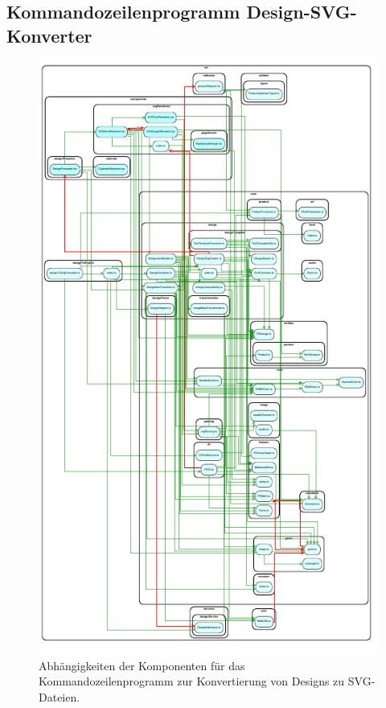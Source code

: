 \subsection{Kommandozeilenprogramm Design-SVG-Konverter}
\begin{figure}[H]
    \centering
    \includegraphics{diagrams/Ist-Architektur/designToSvgCLI-analysis.pdf}
    \caption{Abhängigkeiten der Komponenten für das Kommandozeilenprogramm zur Konvertierung von Designs zu SVG-Dateien.}
    \label{fig:DesignToSvg}
\end{figure}
\begin{multicols}{2}
    
\end{multicols}